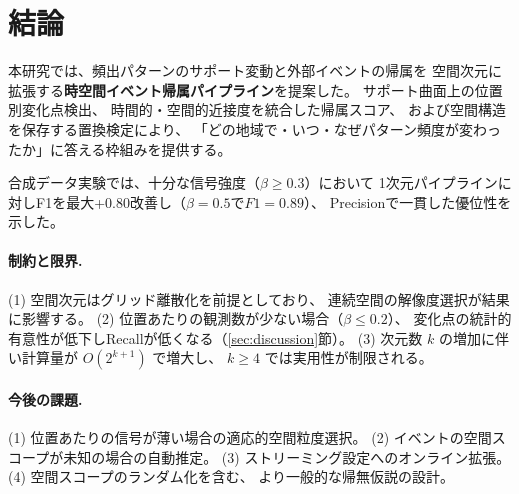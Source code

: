 \section{結論}\label{sec:conclusion}

本研究では、頻出パターンのサポート変動と外部イベントの帰属を
空間次元に拡張する\textbf{時空間イベント帰属パイプライン}を提案した。
サポート曲面上の位置別変化点検出、
時間的・空間的近接度を統合した帰属スコア、
および空間構造を保存する置換検定により、
「どの地域で・いつ・なぜパターン頻度が変わったか」に答える枠組みを提供する。

合成データ実験では、十分な信号強度（$\beta \geq 0.3$）において
1次元パイプラインに対しF1を最大+0.80改善し（$\beta = 0.5$で$F1 = 0.89$）、
Precisionで一貫した優位性を示した。

\paragraph{制約と限界.}
(1) 空間次元はグリッド離散化を前提としており、
連続空間の解像度選択が結果に影響する。
(2) 位置あたりの観測数が少ない場合（$\beta \leq 0.2$）、
変化点の統計的有意性が低下しRecallが低くなる（\ref{sec:discussion}節）。
(3) 次元数 $k$ の増加に伴い計算量が $O(2^{k+1})$ で増大し、
$k \geq 4$ では実用性が制限される。

\paragraph{今後の課題.}
(1) 位置あたりの信号が薄い場合の適応的空間粒度選択。
(2) イベントの空間スコープが未知の場合の自動推定。
(3) ストリーミング設定へのオンライン拡張。
(4) 空間スコープのランダム化を含む、
より一般的な帰無仮説の設計。

